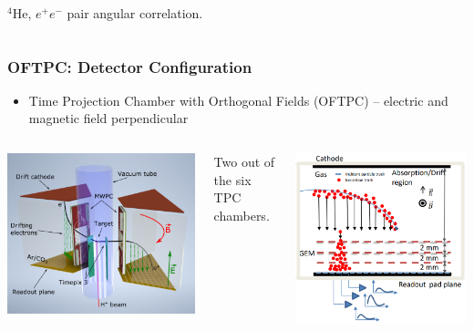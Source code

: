 \documentclass{beamer}
\begin{document}
\begin{frame}
\begin{itemize}
\begin{columns}
\begin{minipage}[t][4cm]{\textwidth}
					\end{minipage}
					\footnotesize{$ {}^4\text{He} $, $e^{+}e^{-}$ pair angular correlation.~\cite{atomki_he}}
			\end{columns}
		\end{itemize}
	\end{frame}
	\begin{frame}
		\frametitle{OFTPC: Detector Configuration}
		\begin{itemize}
			\item Time Projection Chamber with Orthogonal Fields (OFTPC) -- electric and magnetic field perpendicular
		\end{itemize}
		\begin{columns}
				\centering
				\begin{minipage}[t][4.05cm]{\textwidth}
					\centering
					\includegraphics[width=0.82\linewidth]{../images/diagram.png}\newline
				\end{minipage}
				Two out of the six TPC chambers.~\cite{poster}
				\centering
				\begin{minipage}[t][4.05cm]{\textwidth}
					\centering
					\includegraphics[width=0.71\linewidth]{../images/diagram2.png}\newline

\end{minipage}
\end{columns}
\end{frame}
\end{document}
